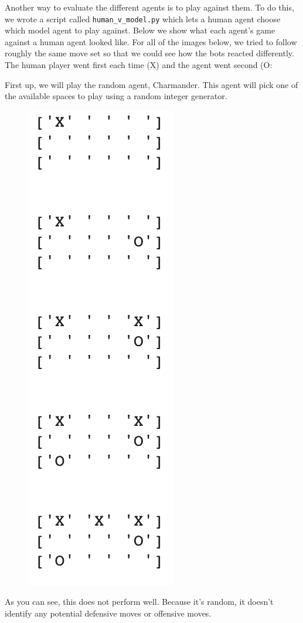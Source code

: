 
	
	


Another way to evaluate the different agents is to play against them.
To do this, we wrote a script called \texttt{human\_v\_model.py} which lets a human agent choose which model agent to play against.
Below we show what each agent's game against a human agent looked like.
For all of the images below, we tried to follow roughly the same move set so that we could see how the bots reacted differently.
The human player went first each time (X) and the agent went second (O:

First up, we will play the random agent, Charmander.
This agent will pick one of the available spaces to play using a random integer generator.
\begin{figure}[H]
	\centering
	\includegraphics[scale=.5]{h_v_random}
\end{figure}
As you can see, this does not perform well.
Because it's random, it doesn't identify any potential defensive moves or offensive moves.

